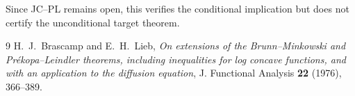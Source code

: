 \documentclass[11pt]{amsart}
\begin{document}
Since JC--PL remains open, this verifies the conditional implication but
does not certify the unconditional target theorem.

\begin{thebibliography}{9}
H.~J.~Brascamp and E.~H.~Lieb,
\emph{On extensions of the Brunn--Minkowski and Pr\'ekopa--Leindler
theorems, including inequalities for log concave functions, and with an
application to the diffusion equation},
J. Functional Analysis \textbf{22} (1976), 366--389.
\end{thebibliography}
\end{document}
